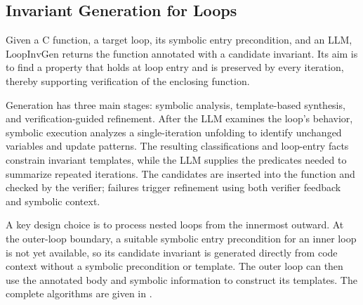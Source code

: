 
\subsection{Invariant Generation for Loops}
{Given a C function, a target loop, its symbolic entry precondition, and an LLM, $\mathrm{LoopInvGen}$ returns the function annotated with a candidate invariant. Its aim is to find a property that holds at loop entry and is preserved by every iteration, thereby supporting verification of the enclosing function.}

{Generation has three main stages: symbolic analysis, template-based synthesis, and verification-guided refinement. After the LLM examines the loop's behavior, symbolic execution analyzes a single-iteration unfolding to identify unchanged variables and update patterns. The resulting classifications and loop-entry facts constrain invariant templates, while the LLM supplies the predicates needed to summarize repeated iterations. The candidates are inserted into the function and checked by the verifier; failures trigger refinement using both verifier feedback and symbolic context.}

{A key design choice is to process nested loops from the innermost outward. At the outer-loop boundary, a suitable symbolic entry precondition for an inner loop is not yet available, so its candidate invariant is generated directly from code context without a symbolic precondition or template. The outer loop can then use the annotated body and symbolic information to construct its templates. The complete algorithms are given in .}

